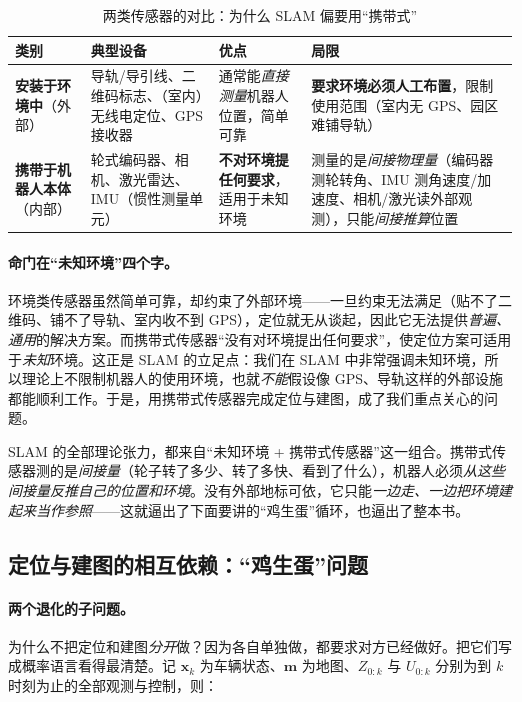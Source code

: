 \begin{table}[H]\centering\small
\caption{两类传感器的对比：为什么 SLAM 偏要用“携带式”}
\label{tab:intro-sensors}
\begin{tabular}{p{} p{} p{} p{}}
\toprule
类别 & 典型设备 & 优点 & 局限 \\
\midrule
\textbf{安装于环境中}（外部） & 导轨/导引线、二维码标志、（室内）无线电定位、GPS 接收器 & 通常能\emph{直接测量}机器人位置，简单可靠 & \textbf{要求环境必须人工布置}，限制使用范围（室内无 GPS、园区难铺导轨） \\
\textbf{携带于机器人本体}（内部） & 轮式编码器、相机、激光雷达、IMU（惯性测量单元） & \textbf{不对环境提任何要求}，适用于未知环境 & 测量的是\emph{间接物理量}（编码器测轮转角、IMU 测角速度/加速度、相机/激光读外部观测），只能\emph{间接推算}位置 \\
\bottomrule
\end{tabular}
\end{table}

\paragraph{命门在“未知环境”四个字。}
环境类传感器虽然简单可靠，却约束了外部环境——一旦约束无法满足（贴不了二维码、铺不了导轨、室内收不到 GPS），定位就无从谈起，因此它无法提供\emph{普遍、通用}的解决方案。而携带式传感器“没有对环境提出任何要求”，使定位方案可适用于\emph{未知}环境\cite{gaoxiang2019slam14}。这正是 SLAM 的立足点：我们在 SLAM 中非常强调未知环境，所以理论上不限制机器人的使用环境，也就\emph{不能}假设像 GPS、导轨这样的外部设施都能顺利工作。于是，用携带式传感器完成定位与建图，成了我们重点关心的问题。

\begin{insight}
SLAM 的全部理论张力，都来自“未知环境 + 携带式传感器”这一组合。携带式传感器测的是\emph{间接量}（轮子转了多少、转了多快、看到了什么），机器人必须\emph{从这些间接量反推自己的位置和环境}。没有外部地标可依，它只能\emph{一边走、一边把环境建起来当作参照}——这就逼出了下面要讲的“鸡生蛋”循环，也逼出了整本书。
\end{insight}

\subsection{定位与建图的相互依赖：“鸡生蛋”问题}
\label{sec:intro-chicken-egg}

\paragraph{两个退化的子问题。}
为什么不把定位和建图\emph{分开}做？因为各自单独做，都要求对方已经做好。把它们写成概率语言看得最清楚\cite{durrantwhyte2006slam}。记 $\mathbf{x}_k$ 为车辆状态、$\mathbf{m}$ 为地图、$Z_{0:k}$ 与 $U_{0:k}$ 分别为到 $k$ 时刻为止的全部观测与控制，则：

